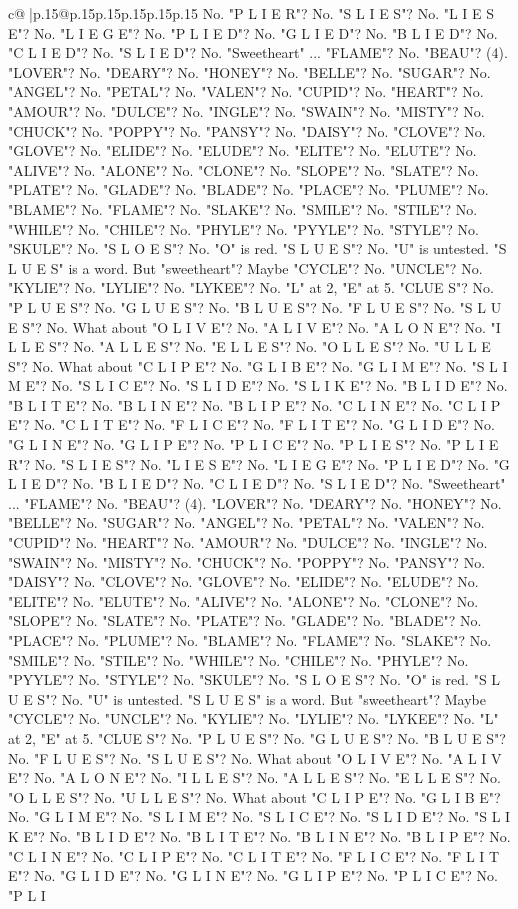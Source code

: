 \documentclass{article}
\begin{document}
{\begin{supertabular}{c@{$\;$}|p{.15\linewidth}@{}p{.15\linewidth}p{.15\linewidth}p{.15\linewidth}p{.15\linewidth}p{.15\linewidth}}
{{{No. "P L I E R"? No. "S L I E S"? No. "L I E S E"? No. "L I E G E"? No. "P L I E D"? No. "G L I E D"? No. "B L I E D"? No. "C L I E D"? No. "S L I E D"? No. "Sweetheart" ... "FLAME"? No. "BEAU"? (4). "LOVER"? No. "DEARY"? No. "HONEY"? No. "BELLE"? No. "SUGAR"? No. "ANGEL"? No. "PETAL"? No. "VALEN"? No. "CUPID"? No. "HEART"? No. "AMOUR"? No. "DULCE"? No. "INGLE"? No. "SWAIN"? No. "MISTY"? No. "CHUCK"? No. "POPPY"? No. "PANSY"? No. "DAISY"? No. "CLOVE"? No. "GLOVE"? No. "ELIDE"? No. "ELUDE"? No. "ELITE"? No. "ELUTE"? No. "ALIVE"? No. "ALONE"? No. "CLONE"? No. "SLOPE"? No. "SLATE"? No. "PLATE"? No. "GLADE"? No. "BLADE"? No. "PLACE"? No. "PLUME"? No. "BLAME"? No. "FLAME"? No. "SLAKE"? No. "SMILE"? No. "STILE"? No. "WHILE"? No. "CHILE"? No. "PHYLE"? No. "PYYLE"? No. "STYLE"? No. "SKULE"? No. "S L O E S"? No. "O" is red. "S L U E S"? No. "U" is untested. "S L U E S" is a word. But "sweetheart"? Maybe "CYCLE"? No. "UNCLE"? No. "KYLIE"? No. "LYLIE"? No. "LYKEE"? No. "L" at 2, "E" at 5. "CLUE S"? No. "P L U E S"? No. "G L U E S"? No. "B L U E S"? No. "F L U E S"? No. "S L U E S"? No. What about "O L I V E"? No. "A L I V E"? No. "A L O N E"? No. "I L L E S"? No. "A L L E S"? No. "E L L E S"? No. "O L L E S"? No. "U L L E S"? No. What about "C L I P E"? No. "G L I B E"? No. "G L I M E"? No. "S L I M E"? No. "S L I C E"? No. "S L I D E"? No. "S L I K E"? No. "B L I D E"? No. "B L I T E"? No. "B L I N E"? No. "B L I P E"? No. "C L I N E"? No. "C L I P E"? No. "C L I T E"? No. "F L I C E"? No. "F L I T E"? No. "G L I D E"? No. "G L I N E"? No. "G L I P E"? No. "P L I C E"? No. "P L I E S"? No. "P L I E R"? No. "S L I E S"? No. "L I E S E"? No. "L I E G E"? No. "P L I E D"? No. "G L I E D"? No. "B L I E D"? No. "C L I E D"? No. "S L I E D"? No. "Sweetheart" ... "FLAME"? No. "BEAU"? (4). "LOVER"? No. "DEARY"? No. "HONEY"? No. "BELLE"? No. "SUGAR"? No. "ANGEL"? No. "PETAL"? No. "VALEN"? No. "CUPID"? No. "HEART"? No. "AMOUR"? No. "DULCE"? No. "INGLE"? No. "SWAIN"? No. "MISTY"? No. "CHUCK"? No. "POPPY"? No. "PANSY"? No. "DAISY"? No. "CLOVE"? No. "GLOVE"? No. "ELIDE"? No. "ELUDE"? No. "ELITE"? No. "ELUTE"? No. "ALIVE"? No. "ALONE"? No. "CLONE"? No. "SLOPE"? No. "SLATE"? No. "PLATE"? No. "GLADE"? No. "BLADE"? No. "PLACE"? No. "PLUME"? No. "BLAME"? No. "FLAME"? No. "SLAKE"? No. "SMILE"? No. "STILE"? No. "WHILE"? No. "CHILE"? No. "PHYLE"? No. "PYYLE"? No. "STYLE"? No. "SKULE"? No. "S L O E S"? No. "O" is red. "S L U E S"? No. "U" is untested. "S L U E S" is a word. But "sweetheart"? Maybe "CYCLE"? No. "UNCLE"? No. "KYLIE"? No. "LYLIE"? No. "LYKEE"? No. "L" at 2, "E" at 5. "CLUE S"? No. "P L U E S"? No. "G L U E S"? No. "B L U E S"? No. "F L U E S"? No. "S L U E S"? No. What about "O L I V E"? No. "A L I V E"? No. "A L O N E"? No. "I L L E S"? No. "A L L E S"? No. "E L L E S"? No. "O L L E S"? No. "U L L E S"? No. What about "C L I P E"? No. "G L I B E"? No. "G L I M E"? No. "S L I M E"? No. "S L I C E"? No. "S L I D E"? No. "S L I K E"? No. "B L I D E"? No. "B L I T E"? No. "B L I N E"? No. "B L I P E"? No. "C L I N E"? No. "C L I P E"? No. "C L I T E"? No. "F L I C E"? No. "F L I T E"? No. "G L I D E"? No. "G L I N E"? No. "G L I P E"? No. "P L I C E"? No. "P L I }}}
\end{supertabular}}
\end{document}
